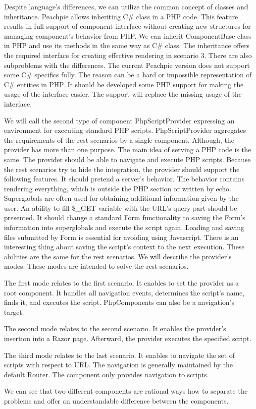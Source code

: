 Despite language's differences, we can utilize the common concept of classes and inheritance.
Peachpie allows inheriting C\# class in a PHP code.
This feature results in full support of component interface without creating new structures for managing component's behavior from PHP.
We can inherit ComponentBase class in PHP and use its methods in the same way as C\# class.
The inheritance offers the required interface for creating effective rendering in scenario 3.
There are also subproblems with the differences.
The current Peachpie version does not support some C\# specifics fully.
The reason can be a hard or impossible representation of C\# entities in PHP.
It should be developed some PHP support for making the usage of the interface easier.
The support will replace the missing usage of the interface.
\par
We will call the second type of component PhpScriptProvider expressing an environment for executing standard PHP scripts.
PhpScriptProvider aggregates the requirements of the rest scenarios by a single component.
Although, the provider has more than one purpose.
The main idea of serving a PHP code is the same.
The provider should be able to navigate and execute PHP scripts.
Because the rest scenarios try to hide the integration, the provider should support the following features.
It should pretend a server's behavior.
The behavior contains rendering everything, which is outside the PHP section or written by echo.
Superglobals are often used for obtaining additional information given by the user.
An ability to fill \$\_GET variable with the URL's query part should be presented.
It should change a standard Form functionality to saving the Form's information into superglobals and execute the script again.
Loading and saving files submitted by Form is essential for avoiding using Javascript.
There is an interesting thing about saving the script's context to the next execution.
These abilities are the same for the rest scenarios.
We will describe the provider's modes.
These modes are intended to solve the rest scenarios. 
\par
The first mode relates to the first scenario.
It enables to set the provider as a root component.
It handles all navigation events, determines the script's name, finds it, and executes the script.
PhpComponents can also be a navigation's target.
\par
The second mode relates to the second scenario.
It enables the provider's insertion into a Razor page.
Afterward, the provider executes the specified script.
\par
The third mode relates to the last scenario.
It enables to navigate the set of scripts with respect to URL.
The navigation is generally maintained by the default Router.
The component only provides navigation to scripts.
\par
We can see that two different components are rational ways how to separate the problems and offer an understandable difference between the components.


